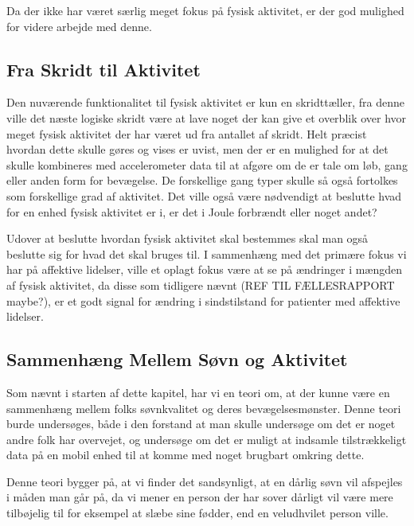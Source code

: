 Da der ikke har været særlig meget fokus på fysisk aktivitet, er der god mulighed for videre arbejde med denne.

\subsection{Fra Skridt til Aktivitet}
Den nuværende funktionalitet til fysisk aktivitet er kun en skridttæller, fra denne ville det næste logiske skridt være at lave noget der kan give et overblik over hvor meget fysisk aktivitet der har været ud fra antallet af skridt.
Helt præcist hvordan dette skulle gøres og vises er uvist, men der er en mulighed for at det skulle kombineres med accelerometer data til at afgøre om de er tale om løb, gang eller anden form for bevægelse.
De forskellige gang typer skulle så også fortolkes som forskellige grad af aktivitet. 
Det ville også være nødvendigt at beslutte hvad for en enhed fysisk aktivitet er i, er det i Joule forbrændt eller noget andet?

Udover at beslutte hvordan fysisk aktivitet skal bestemmes skal man også beslutte sig for hvad det skal bruges til.
I sammenhæng med det primære fokus vi har på affektive lidelser, ville et oplagt fokus være at se på ændringer i mængden af fysisk aktivitet, da disse som tidligere nævnt (REF TIL FÆLLESRAPPORT maybe?), er et godt signal for ændring i sindstilstand for patienter med affektive lidelser.

\subsection{Sammenhæng Mellem Søvn og Aktivitet}
Som nævnt i starten af dette kapitel, har vi en teori om, at der kunne være en sammenhæng mellem folks søvnkvalitet og deres bevægelsesmønster.
Denne teori burde undersøges, både i den forstand at man skulle undersøge om det er noget andre folk har overvejet, og undersøge om det er muligt at indsamle tilstrækkeligt data på en mobil enhed til at komme med noget brugbart omkring dette.

Denne teori bygger på, at vi finder det sandsynligt, at en dårlig søvn vil afspejles i måden man går på, da vi mener en person der har sover dårligt vil være mere tilbøjelig til for eksempel at slæbe sine fødder, end en veludhvilet person ville.

